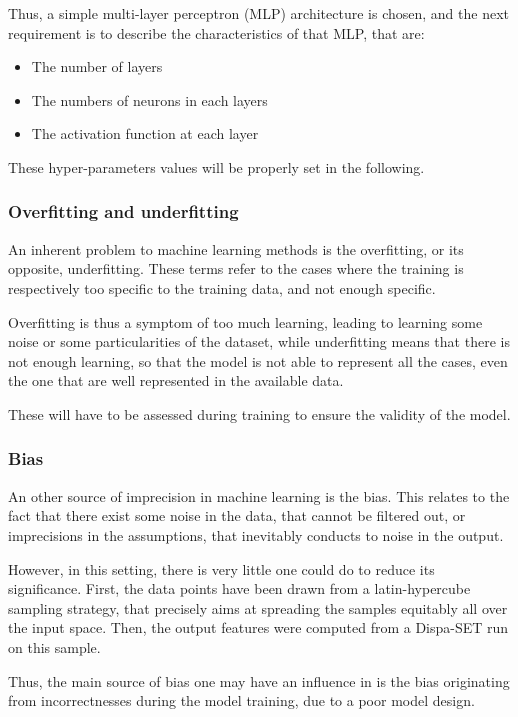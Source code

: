 Thus, a simple multi-layer perceptron (MLP) architecture is chosen, and the next requirement is to describe the characteristics of that MLP, that are:
\begin{itemize}
    \item The number of layers
    \item The numbers of neurons in each layers
    \item The activation function at each layer
\end{itemize}

These hyper-parameters values will be properly set in the following.

\subsubsection{Overfitting and underfitting}

An inherent problem to machine learning methods is the overfitting, or its opposite, underfitting. These terms refer to the cases where the training is respectively too specific to the training data, and not enough specific.

Overfitting is thus a symptom of too much learning, leading to learning some noise or some particularities of the dataset, while underfitting means that there is not enough learning, so that the model is not able to represent all the cases, even the one that are well represented in the available data.

These will have to be assessed during training to ensure the validity of the model.

\subsubsection{Bias}

An other source of imprecision in machine learning is the bias. This relates to the fact that there exist some noise in the data, that cannot be filtered out, or imprecisions in the assumptions, that inevitably conducts to noise in the output.

However, in this setting, there is very little one could do to reduce its significance. First, the data points have been drawn from a latin-hypercube sampling strategy, that precisely aims at spreading the samples equitably all over the input space. Then, the output features were computed from a Dispa-SET run on this sample.

Thus, the main source of bias one may have an influence in is the bias originating from incorrectnesses during the model training, due to a poor model design.

